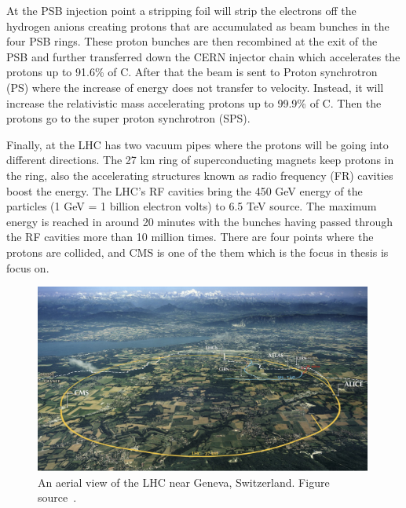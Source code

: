 At the PSB injection point a stripping foil will strip the electrons off the hydrogen anions creating protons that are accumulated as beam bunches in the four PSB rings. These proton bunches are then recombined at the exit of the PSB and further transferred down the CERN injector chain which accelerates the protons up to 91.6\% of C. After that the beam is sent to Proton synchrotron (PS) where the increase of energy does not transfer to velocity. Instead, it will increase the relativistic mass accelerating protons up to 99.9\% of C. Then the protons go to the super proton synchrotron (SPS).

Finally, at the LHC has two vacuum pipes where the protons will be going into different directions. The 27 km ring of superconducting magnets keep protons in the ring, also the accelerating structures known as radio frequency (FR) cavities boost the energy. The LHC’s RF cavities bring the 450 GeV energy of the particles (1 GeV = 1 billion electron volts) to 6.5 TeV source.
The maximum energy is reached in around 20 minutes with the bunches having passed through the RF cavities more than 10 million times.
There are four  points where the protons are collided, and CMS is one of the them which is the focus in thesis is focus on. 

\begin{figure}[t!]
\centering
\includegraphics[width=0.99\textwidth]{figures/LHC_location.png}
\caption[An aerial view of the LHC near Geneva, Switzerland]{An aerial view of the LHC near Geneva, Switzerland. Figure source~\cite{SMtable}.}
\label{fig:LHC_location}
\end{figure}

